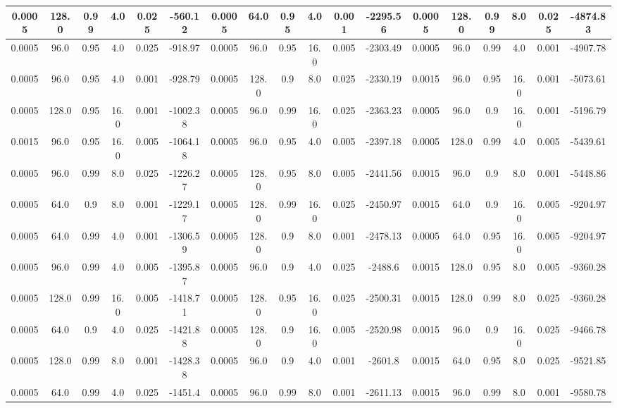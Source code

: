 \begin{table}[h]
    \centering
    \begin{tabular}{|c|c|c|c|c|c||c|c|c|c|c|c||c|c|c|c|c|c|}
    \hline
    0.0005 & 128.0 & 0.99 & 4.0 & 0.025 & -560.12 & 0.0005 & 64.0 & 0.95 & 4.0 & 0.001 & -2295.56 & 0.0005 & 128.0 & 0.99 & 8.0 & 0.025 & -4874.83 \\
    \hline
    0.0005 & 96.0 & 0.95 & 4.0 & 0.025 & -918.97 & 0.0005 & 96.0 & 0.95 & 16.0 & 0.005 & -2303.49 & 0.0005 & 96.0 & 0.99 & 4.0 & 0.001 & -4907.78 \\
    \hline
    0.0005 & 96.0 & 0.95 & 4.0 & 0.001 & -928.79 & 0.0005 & 128.0 & 0.9 & 8.0 & 0.025 & -2330.19 & 0.0015 & 96.0 & 0.95 & 16.0 & 0.001 & -5073.61 \\
    \hline
    0.0005 & 128.0 & 0.95 & 16.0 & 0.001 & -1002.38 & 0.0005 & 96.0 & 0.99 & 16.0 & 0.025 & -2363.23 & 0.0005 & 96.0 & 0.9 & 16.0 & 0.001 & -5196.79 \\
    \hline
    0.0015 & 96.0 & 0.95 & 16.0 & 0.005 & -1064.18 & 0.0005 & 96.0 & 0.95 & 4.0 & 0.005 & -2397.18 & 0.0005 & 128.0 & 0.99 & 4.0 & 0.005 & -5439.61 \\
    \hline
    0.0005 & 96.0 & 0.99 & 8.0 & 0.025 & -1226.27 & 0.0005 & 128.0 & 0.95 & 8.0 & 0.005 & -2441.56 & 0.0015 & 96.0 & 0.9 & 8.0 & 0.001 & -5448.86 \\
    \hline
    0.0005 & 64.0 & 0.9 & 8.0 & 0.001 & -1229.17 & 0.0005 & 128.0 & 0.99 & 16.0 & 0.025 & -2450.97 & 0.0015 & 64.0 & 0.9 & 16.0 & 0.005 & -9204.97 \\
    \hline
    0.0005 & 64.0 & 0.99 & 4.0 & 0.001 & -1306.59 & 0.0005 & 128.0 & 0.9 & 8.0 & 0.001 & -2478.13 & 0.0005 & 64.0 & 0.95 & 16.0 & 0.005 & -9204.97 \\
    \hline
    0.0005 & 96.0 & 0.99 & 4.0 & 0.005 & -1395.87 & 0.0005 & 96.0 & 0.9 & 4.0 & 0.025 & -2488.6 & 0.0015 & 128.0 & 0.95 & 8.0 & 0.005 & -9360.28 \\
    \hline
    0.0005 & 128.0 & 0.99 & 16.0 & 0.005 & -1418.71 & 0.0005 & 128.0 & 0.95 & 16.0 & 0.025 & -2500.31 & 0.0015 & 128.0 & 0.99 & 8.0 & 0.025 & -9360.28 \\
    \hline
    0.0005 & 64.0 & 0.9 & 4.0 & 0.025 & -1421.88 & 0.0005 & 128.0 & 0.9 & 16.0 & 0.005 & -2520.98 & 0.0015 & 96.0 & 0.9 & 16.0 & 0.025 & -9466.78 \\
    \hline
    0.0005 & 128.0 & 0.99 & 8.0 & 0.001 & -1428.38 & 0.0005 & 96.0 & 0.9 & 4.0 & 0.001 & -2601.8 & 0.0015 & 64.0 & 0.95 & 8.0 & 0.025 & -9521.85 \\
    \hline
    0.0005 & 64.0 & 0.99 & 4.0 & 0.025 & -1451.4 & 0.0005 & 96.0 & 0.99 & 8.0 & 0.001 & -2611.13 & 0.0015 & 96.0 & 0.99 & 8.0 & 0.001 & -9580.78 \\

\end{tabular}
\end{table}
